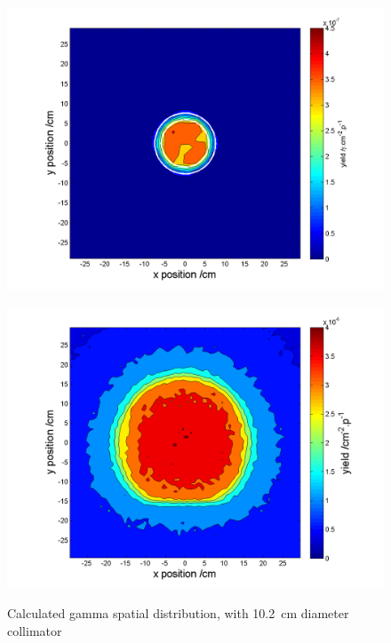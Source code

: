 \documentclass[11pt,a4paper]{IEEEtran}
\let\MYoriglatexcaption\caption
\renewcommand{\caption}[2][\relax]{\MYoriglatexcaption[#2]{#2}}
\begin{document}
\begin{figure}[t]
    \begin{minipage}{\columnwidth}
        \includegraphics[width=\columnwidth]{SUP10ColSpatialDistributionAllG.png}
        \label{fig:GammaSpatialDistributionSUP}
    \end{minipage}
    \begin{minipage}{\columnwidth}
        \includegraphics[width=\columnwidth]{CUP10ColSpatialDistributionAllG.png}
        \label{fig:GammaSpatialDistributionCUP}
    \end{minipage}
    \caption{
        Calculated gamma spatial distribution, with
        \SI{10.2}{\cm} diameter collimator
    }
    \label{fig:GammaSpatialDistribution}
\end{figure}
\end{document}
